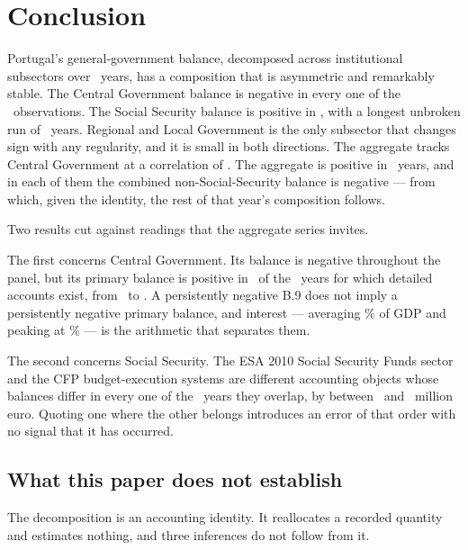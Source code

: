 
\section{Conclusion}
\label{sec:conclusion}

Portugal's general-government balance, decomposed across institutional subsectors
over \PanelYears\ years, has a composition that is asymmetric and remarkably stable.
The Central Government balance is negative in every one of the
\CentralNegativeYears\ observations. The Social Security balance is positive in
\SsfPositiveYears, with a longest unbroken run of \SsfLongestPositiveRun\ years.
Regional and Local Government is the only subsector that changes sign with any
regularity, and it is small in both directions. The aggregate tracks Central
Government at a correlation of \AggregateCentralCorrelation. The aggregate is positive
in \NumPositiveYears\ years, and in each of them the combined non-Social-Security
balance is negative --- from which, given the identity, the rest of that year's
composition follows.

Two results cut against readings that the aggregate series invites.

The first concerns Central Government. Its balance is negative throughout the panel,
but its primary balance is positive in \PrimaryPositiveYears\ of the
\PrimaryObservedYears\ years for which detailed accounts exist, from
\PrimaryPositiveFirst\ to \PrimaryPositiveLast. A persistently negative B.9 does not
imply a persistently negative primary balance, and interest --- averaging
\InterestMeanPct\% of GDP and peaking at \InterestPeakPct\% --- is the arithmetic that
separates them.

The second concerns Social Security. The ESA 2010 Social Security Funds sector and
the CFP budget-execution systems are different accounting objects whose balances
differ in every one of the \SsfBoundaryYears\ years they overlap, by between
\SsfBoundaryMin\ and \SsfBoundaryMax\ million euro. Quoting one where the other
belongs introduces an error of that order with no signal that it has occurred.

\subsection{What this paper does not establish}

The decomposition is an accounting identity. It reallocates a recorded quantity and
estimates nothing, and three inferences do not follow from it.

